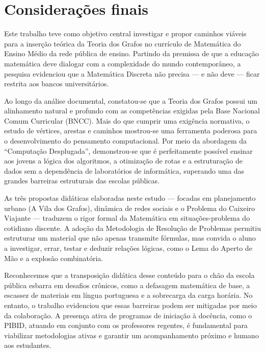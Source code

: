 \documentclass[
  12pt,
  oneside,
  a4paper,
  english,
  brazilian
  ]{abntex2}
\theoremstyle{definition}
\begin{document}
\chapter{Considerações finais}


Este trabalho teve como objetivo central investigar e propor caminhos viáveis para a inserção teórica da Teoria dos Grafos no currículo de Matemática do Ensino Médio da rede pública de ensino. Partindo da premissa de que a educação matemática deve dialogar com a complexidade do mundo contemporâneo, a pesquisa evidenciou que a Matemática Discreta não precisa --- e não deve --- ficar restrita aos bancos universitários.

Ao longo da análise documental, constatou-se que a Teoria dos Grafos possui um alinhamento natural e profundo com as competências exigidas pela Base Nacional Comum Curricular (BNCC). Mais do que cumprir uma exigência normativa, o estudo de vértices, arestas e caminhos mostrou-se uma ferramenta poderosa para o desenvolvimento do pensamento computacional. Por meio da abordagem da ``Computação Desplugada'', demonstrou-se que é perfeitamente possível ensinar aos jovens a lógica dos algoritmos, a otimização de rotas e a estruturação de dados sem a dependência de laboratórios de informática, superando uma das grandes barreiras estruturais das escolas públicas.

As três propostas didáticas elaboradas neste estudo --- focadas em planejamento urbano (A Vila dos Grafos), dinâmica de redes sociais e o Problema do Caixeiro Viajante --- traduzem o rigor formal da Matemática em situações-problema do cotidiano discente. A adoção da Metodologia de Resolução de Problemas permitiu estruturar um material que não apenas transmite fórmulas, mas convida o aluno a investigar, errar, testar e deduzir relações lógicas, como o Lema do Aperto de Mão e a explosão combinatória.

Reconhecemos que a transposição didática desse conteúdo para o chão da escola pública esbarra em desafios crônicos, como a defasagem matemática de base, a escassez de materiais em língua portuguesa e a sobrecarga da carga horária. No entanto, o trabalho evidenciou que essas barreiras podem ser mitigadas por meio da colaboração. A presença ativa de programas de iniciação à docência, como o PIBID, atuando em conjunto com os professores regentes, é fundamental para viabilizar metodologias ativas e garantir um acompanhamento próximo e humano aos estudantes.
\end{document}
